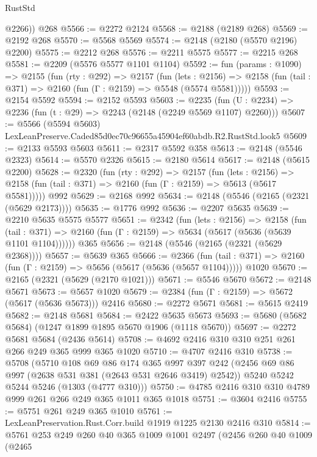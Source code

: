 \begin{lexlean}{RustStd}
\begin{coremodule}
        @2266))
    @268
@5566 := @2272 @2124
@5568 := @2188 (@2189 @268)
@5569 := @2192 @268
@5570 := @5568 @5569
@5574 := @2148 (@2180 (@5570 @2196) @2200)
@5575 := @2212 @268
@5576 := @2211 @5575
@5577 := @2215 @268
@5581 := @2209 (@5576 @5577 @1101 @1104)
@5592 := fun (params : @1090) =>
  @2155
    (fun (rty : @292) =>
    @2157
      (fun (lets : @2156) =>
      @2158 (fun (tail : @371) => @2160 (fun (Γ : @2159) => @5548 (@5574 @5581)))))
@5593 := @2154 @5592
@5594 := @2152 @5593
@5603 := @2235 (fun (U : @2234) => @2236 (fun (t : @29) => @2243 (@2148 (@2249 @5569 @1107) @2260)))
@5607 := @5566 (@5594 @5603) LexLeanPreserve.Caded85d0ec70c96655a45904ef60abdb.R2.RustStd.look5
@5609 := @2133 @5593 @5603
@5611 := @2317 @5592 @358
@5613 := @2148 (@5546 @2323)
@5614 := @5570 @2326
@5615 := @2180 @5614
@5617 := @2148 (@5615 @2200)
@5628 := @2320
    (fun (rty : @292) =>
    @2157
      (fun (lets : @2156) =>
      @2158 (fun (tail : @371) => @2160 (fun (Γ : @2159) => @5613 (@5617 @5581)))))
    @992
@5629 := @2168 @992
@5634 := @2148 (@5546 (@2165 (@2321 (@5629 @2173))))
@5635 := @1776 @992
@5636 := @2207 @5635
@5639 := @2210 @5635 @5575 @5577
@5651 := @2342
    (fun (lets : @2156) =>
    @2158
      (fun (tail : @371) => @2160 (fun (Γ : @2159) => @5634 (@5617 (@5636 (@5639 @1101 @1104))))))
    @365
@5656 := @2148 (@5546 (@2165 (@2321 (@5629 @2368))))
@5657 := @5639 @365
@5666 := @2366
    (fun (tail : @371) => @2160 (fun (Γ : @2159) => @5656 (@5617 (@5636 (@5657 @1104)))))
    @1020
@5670 := @2165 (@2321 (@5629 (@2170 @1021)))
@5671 := @5546 @5670
@5672 := @2148 @5671
@5673 := @5657 @1020
@5679 := @2384 (fun (Γ : @2159) => @5672 (@5617 (@5636 @5673))) @2416
@5680 := @2272 @5671
@5681 := @5615 @2419
@5682 := @2148 @5681
@5684 := @2422 @5635 @5673
@5693 := @5680 (@5682 @5684) (@1247 @1899 @1895 @5670 @1906 (@1118 @5670))
@5697 := @2272 @5681 @5684 (@2436 @5614)
@5708 := @4692 @2416 @310 @310 @251 @261 @266 @249 @365 @999 @365 @1020
@5710 := @4707 @2416 @310
@5738 := @5708
    (@5710
      @108
      @69
      @86
      @174
      @365
      @997
      @397
      @242
      (@2456 @69 @86 @997 (@2638 @531 @381 (@2643 @531 @2646 @3419) @2542))
      @5240
      @5242
      @5244
      @5246
      (@1303 (@4777 @310)))
@5750 := @4785 @2416 @310 @310 @4789 @999 @261 @266 @249 @365 @1011 @365 @1018
@5751 := @3604 @2416
@5755 := @5751 @261 @249 @365 @1010
@5761 := LexLeanPreservation.Rust.Corr.build @1919 @1225 @2130 @2416 @310
@5814 := @5761
    @253
    @249
    @260
    @40
    @365
    @1009
    @1001
    @2497
    (@2456
      @260
      @40
      @1009
      (@2465

\end{coremodule}
\end{lexlean}
